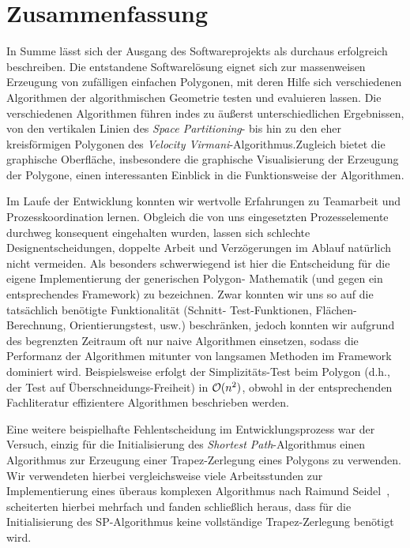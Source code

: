 \section{Zusammenfassung}

  In Summe lässt sich der Ausgang des Softwareprojekts als durchaus
  erfolgreich beschreiben. Die entstandene Softwarelösung eignet sich zur
  massenweisen Erzeugung von zufälligen einfachen Polygonen, mit deren Hilfe
  sich verschiedenen Algorithmen der algorithmischen Geometrie testen und
  evaluieren lassen. Die verschiedenen Algorithmen führen indes zu äußerst
  unterschiedlichen Ergebnissen, von den vertikalen Linien des \emph{Space
  Partitioning}- bis hin zu den eher kreisförmigen Polygonen des
  \emph{Velocity Virmani}-Algorithmus.Zugleich bietet die graphische
  Oberfläche, insbesondere die graphische Visualisierung der Erzeugung der
  Polygone, einen interessanten Einblick in die Funktionsweise der
  Algorithmen.

  Im Laufe der Entwicklung konnten wir wertvolle Erfahrungen zu Teamarbeit und
  Prozesskoordination lernen. Obgleich die von uns eingesetzten
  Prozesselemente durchweg konsequent eingehalten wurden, lassen sich
  schlechte Designentscheidungen, doppelte Arbeit und Verzögerungen im Ablauf
  natürlich nicht vermeiden. Als besonders schwerwiegend ist hier die
  Entscheidung für die eigene Implementierung der generischen Polygon-
  Mathematik (und gegen ein entsprechendes Framework) zu bezeichnen. Zwar
  konnten wir uns so auf die tatsächlich benötigte Funktionalität (Schnitt-
  Test-Funktionen, Flächen-Berechnung, Orientierungstest, usw.) beschränken,
  jedoch konnten wir aufgrund des begrenzten Zeitraum oft nur naive
  Algorithmen einsetzen, sodass die Performanz der Algorithmen mitunter von
  langsamen Methoden im Framework dominiert wird. Beispielsweise erfolgt der
  Simplizitäts-Test beim Polygon (d.h., der Test auf Überschneidungs-Freiheit)
  in $\mathcal{O}(n^2)$, obwohl in der entsprechenden Fachliteratur effizientere
  Algorithmen beschrieben werden.

  Eine weitere beispielhafte Fehlentscheidung im Entwicklungsprozess war der
  Versuch, einzig für die Initialisierung des \emph{Shortest Path}-Algorithmus
  einen Algorithmus zur Erzeugung einer Trapez-Zerlegung eines Polygons zu
  verwenden. Wir verwendeten hierbei vergleichsweise viele Arbeitsstunden zur
  Implementierung eines überaus komplexen Algorithmus nach Raimund
  Seidel~\cite{seidel91asimple}, scheiterten hierbei mehrfach und fanden
  schließlich heraus, dass für die Initialisierung des SP-Algorithmus keine
  vollständige Trapez-Zerlegung benötigt wird.

